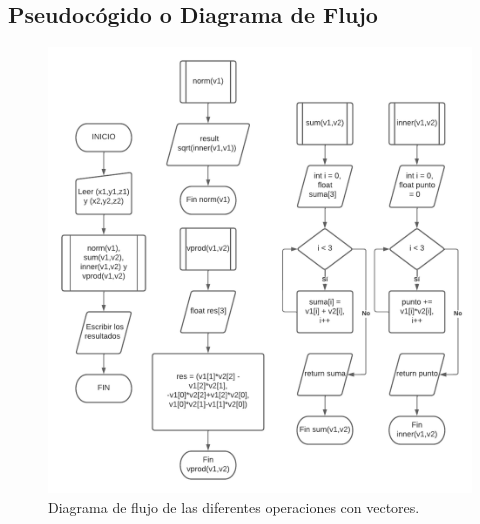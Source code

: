 \subsection{Pseudocógido o Diagrama de Flujo}
\begin{figure}[H]
	\centering
	\includegraphics[scale=0.6]{img/problema3.pdf}
	\caption{Diagrama de flujo de las diferentes operaciones con vectores.}
	\label{DFp5}
\end{figure}


